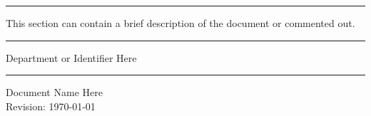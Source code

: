 
	\begin{titlepage}

	\vspace{40pt}

	\rule{\linewidth}{0.5mm}

	\begin{center}
	This section can contain a brief description of the document or commented out.  \\[10pt]
	\end{center}

	\rule{\linewidth}{0.5mm}
	\vspace*{80pt}
	\begin{flushright}
	{\color{Color1}\Large Department or Identifier Here}
	\rule{\linewidth}{2mm}
	{\color{Color1}\Huge Document Name Here} \\ 
	{\normalfont Revision: \today }
	\end{flushright}




\end{titlepage}
